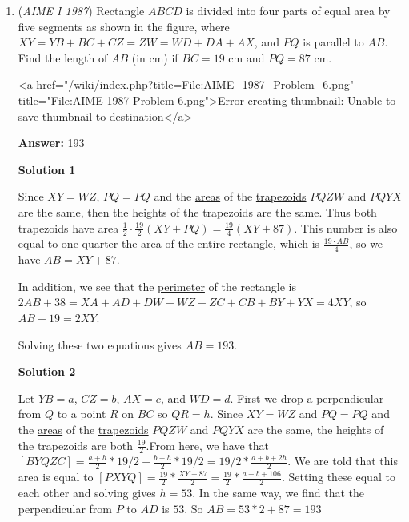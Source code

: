 \begin{enumerate}
 


	\item (\textit{AIME I 1987}) Rectangle $ABCD$ is divided into four parts of equal area by five segments as shown in the figure, where $XY = YB + BC + CZ = ZW = WD + DA + AX$, and $PQ$ is parallel to $AB$.  Find the length of $AB$ (in cm) if $BC = 19$ cm and $PQ = 87$ cm.


 <a href="/wiki/index.php?title=File:AIME\_1987\_Problem\_6.png" title="File:AIME 1987 Problem 6.png">Error creating thumbnail: Unable to save thumbnail to destination</a>

 \textbf{Answer: }193



\textbf{Solution 1}

Since $XY = WZ$, $PQ = PQ$ and the \href{https://artofproblemsolving.com/wiki/index.php?title=Area}{areas} of the \href{https://artofproblemsolving.com/wiki/index.php?title=Trapezoid}{trapezoids} $PQZW$ and $PQYX$ are the same, then the heights of the trapezoids are the same.  Thus both trapezoids have area $\frac{1}{2} \cdot \frac{19}{2}(XY + PQ) = \frac{19}{4}(XY + 87)$.  This number is also equal to one quarter the area of the entire rectangle, which is $\frac{19\cdot AB}{4}$, so we have $AB = XY + 87$.

 In addition, we see that the \href{https://artofproblemsolving.com/wiki/index.php?title=Perimeter}{perimeter} of the rectangle is $2AB + 38 = XA + AD + DW + WZ + ZC + CB + BY + YX = 4XY$, so $AB + 19 = 2XY$.

 Solving these two equations gives $AB = \boxed{193}$.

 


 



\textbf{Solution 2}

Let $YB=a$, $CZ=b$, $AX=c$, and $WD=d$. First we drop a perpendicular from $Q$ to a point $R$ on $BC$ so $QR=h$. Since $XY = WZ$ and $PQ = PQ$ and the \href{https://artofproblemsolving.com/wiki/index.php?title=Area}{areas} of the \href{https://artofproblemsolving.com/wiki/index.php?title=Trapezoid}{trapezoids} $PQZW$ and $PQYX$ are the same, the heights of the trapezoids are both $\frac{19}{2}$.From here, we have that $[BYQZC]=\frac{a+h}{2}*19/2+\frac{b+h}{2}*19/2=19/2* \frac{a+b+2h}{2}$. We are told that this area is equal to $[PXYQ]=\frac{19}{2}* \frac{XY+87}{2}=\frac{19}{2}* \frac{a+b+106}{2}$. Setting these equal to each other and solving gives $h=53$. In the same way, we find that the perpendicular from $P$ to $AD$ is $53$. So $AB=53*2+87=\boxed{193}$





\end{enumerate}
